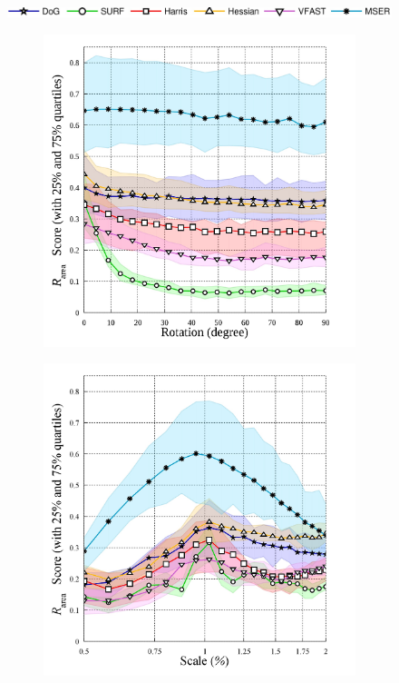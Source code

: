 \begin{figure}[ht]
	\centering 
	\includegraphics[width=0.70\linewidth]{./fig/eval/hlegend.jpg}
	\begin{subfigure}[t]{0.48\linewidth}
		\centering 
		\includegraphics[width=1\linewidth]{./fig/eval/graph_rotation.jpg}
		\label{fig/eval/graph_rotation}
	\end{subfigure}
	\begin{subfigure}[t]{0.48\linewidth}
		\centering 
		\includegraphics[width=1\linewidth]{./fig/eval/graph_scaling.jpg}

\end{subfigure}
\end{figure}
